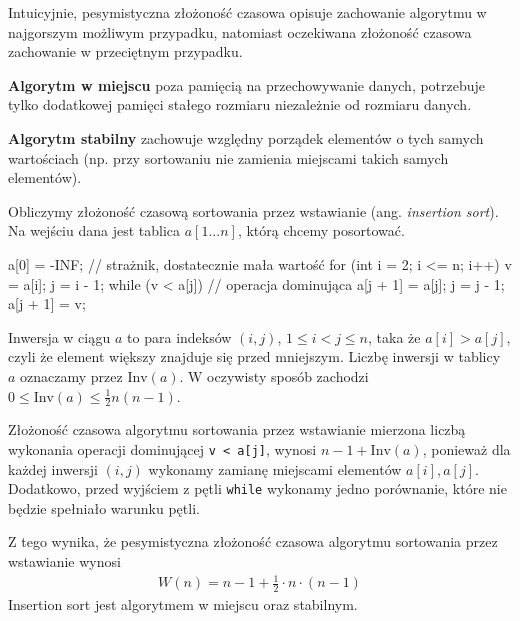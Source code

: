 Intuicyjnie, pesymistyczna złożoność czasowa opisuje zachowanie algorytmu w najgorszym możliwym przypadku, natomiast oczekiwana złożoność czasowa zachowanie w przeciętnym przypadku.
\bigskip

\textbf{Algorytm w miejscu} poza pamięcią na przechowywanie danych, potrzebuje tylko dodatkowej pamięci stałego rozmiaru niezależnie od rozmiaru danych. 

\textbf{Algorytm stabilny} zachowuje względny porządek elementów o tych samych wartościach (np. przy sortowaniu nie zamienia miejscami takich samych elementów).

\begin{example}
    Obliczymy złożoność czasową sortowania przez wstawianie (ang. \textit{insertion sort}). Na wejściu dana jest tablica $a[1...n]$, którą chcemy posortować.
    \begin{cpp}
        a[0] = -INF;              // strażnik, dostatecznie mała wartość
        for (int i = 2; i <= n; i++) {
            v = a[i];
            j = i - 1;
            while (v < a[j]) {    // operacja dominująca
                a[j + 1] = a[j];
                j = j - 1;
            }
            a[j + 1] = v;
        }
    \end{cpp}
    Inwersja w ciągu $a$ to para indeksów $(i, j)$, $1 \leq i < j \leq n$, taka że $a[i] > a[j]$, czyli że element większy znajduje się przed mniejszym. Liczbę inwersji w tablicy $a$ oznaczamy przez $\text{Inv}(a)$. W oczywisty sposób zachodzi $0 \leq \text{Inv}(a) \leq \frac{1}{2}n(n - 1)$.
    
    Złożoność czasowa algorytmu sortowania przez wstawianie mierzona liczbą wykonania operacji dominującej \texttt{v < a[j]}, wynosi $n - 1 + \text{Inv}(a)$, ponieważ dla każdej inwersji $(i, j)$ wykonamy zamianę miejscami elementów $a[i], a[j]$. Dodatkowo, przed wyjściem z pętli \texttt{while} wykonamy jedno porównanie, które nie będzie spełniało warunku pętli.

    Z tego wynika, że pesymistyczna złożoność czasowa algorytmu sortowania przez wstawianie wynosi
    \begin{align*}
        W(n) = n - 1 + \frac{1}{2} \cdot n \cdot (n-1)
    \end{align*}
    Insertion sort jest algorytmem w miejscu oraz stabilnym.
\end{example}


